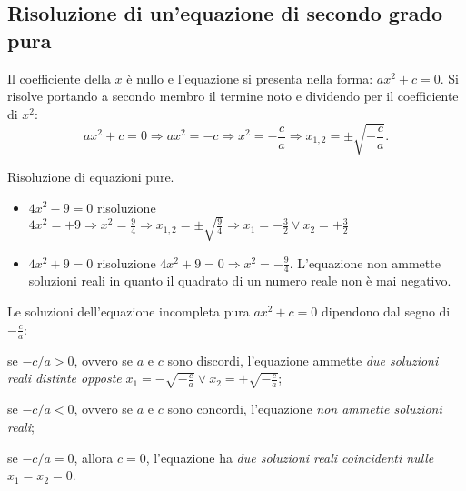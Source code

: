 \subsection{Risoluzione di un'equazione di secondo grado pura}
Il coefficiente della $x$ è nullo e l’equazione si presenta nella forma: $ax ^{2 } + c = 0$.
Si risolve portando a secondo membro il termine noto e dividendo per il coefficiente di $x^2$:
\[a x ^{2 } + c = 0 \Rightarrow a x ^{2 } = - c \Rightarrow x
^{2 } = - \frac{c }{a } \Rightarrow x _{1,2} = \pm \sqrt{- \frac{c}{a}}.\]
\newpage
\begin{exrig}
\begin{esempio}
 Risoluzione di equazioni pure.
\begin{itemize}
\item $4 x ^{2} - 9 =0$ risoluzione
$4 x ^{2 } = + 9 \Rightarrow x ^{2 } = \frac{9 }{4 }
\Rightarrow x _{1,2 } = \pm \sqrt{\frac{9 }{4 } } \Rightarrow x_{1} = - \frac{3 }{2 } \vee x _{2 } = + \frac{3 }{2 }$
\item $4 x ^{2 } + 9 = 0$ risoluzione $4 x ^{2 } + 9 = 0 \Rightarrow x ^{2 } = - \frac{9 }{4 }$. L’equazione non ammette soluzioni reali in quanto il quadrato di un numero reale non è mai negativo.
\end{itemize}
\end{esempio}
\end{exrig}

Le soluzioni dell'equazione incompleta pura $ax ^{2 } + c = 0$ dipendono dal segno di
$- \frac{c }{a }$:
\begin{description*}
\item se $-c/a>0$, ovvero se $a$ e $c$ sono discordi, l’equazione ammette \emph{due soluzioni reali distinte opposte} $x _{1 } = - \sqrt{- \frac{c }{a}} \vee x_{2}= + \sqrt{-\frac{c}{a}}$;
\item se $-c/a<0$, ovvero se $a$ e $c$ sono concordi, l’equazione \emph{non ammette soluzioni reali};
\item se $-c/a=0$, allora $c =0$, l'equazione ha \emph{due soluzioni reali coincidenti nulle} $x_{1}=x_{2} =0$.
\end{description*}

\vspazio\ovalbox{\risolvii \ref{ese:3.1}, \ref{ese:3.2}, \ref{ese:3.3}, \ref{ese:3.4}}

